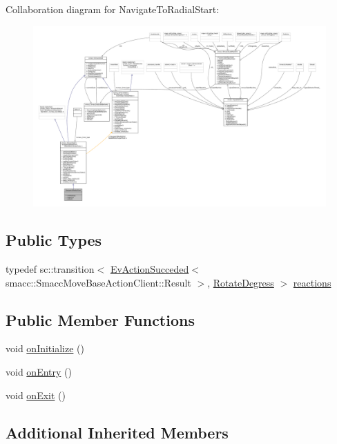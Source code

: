 Collaboration diagram for Navigate\+To\+Radial\+Start\+:
\nopagebreak
\begin{figure}[H]
\begin{center}
\leavevmode
\includegraphics[width=350pt]{structNavigateToRadialStart__coll__graph}
\end{center}
\end{figure}
\subsection*{Public Types}
\begin{DoxyCompactItemize}
\item 
typedef sc\+::transition$<$ \hyperlink{structsmacc_1_1EvActionSucceded}{Ev\+Action\+Succeded}$<$ smacc\+::\+Smacc\+Move\+Base\+Action\+Client\+::\+Result $>$, \hyperlink{structRotateDegress}{Rotate\+Degress} $>$ \hyperlink{structNavigateToRadialStart_a482ff04eb30c30d91af5464d8d7d39f8}{reactions}
\end{DoxyCompactItemize}
\subsection*{Public Member Functions}
\begin{DoxyCompactItemize}
\item 
void \hyperlink{structNavigateToRadialStart_a2743461cb18330b48508562c9ac85b94}{on\+Initialize} ()
\item 
void \hyperlink{structNavigateToRadialStart_afc784866e198f8a4eb6c61ef7391fbbe}{on\+Entry} ()
\item 
void \hyperlink{structNavigateToRadialStart_a152ae667ad376940ab911ec865f36099}{on\+Exit} ()
\end{DoxyCompactItemize}
\subsection*{Additional Inherited Members}


